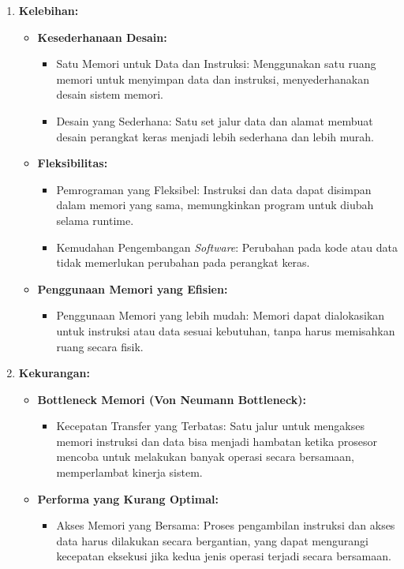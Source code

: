 \documentclass{article}
\begin{document}
\begin{enumerate}[label=\arabic*.]
  \item \textbf{Kelebihan:}
  \begin{itemize}
    \item \textbf{Kesederhanaan Desain:}
    \begin{itemize}
      \item Satu Memori untuk Data dan Instruksi: Menggunakan satu ruang memori untuk menyimpan data dan instruksi, menyederhanakan desain sistem memori.
      \item Desain yang Sederhana: Satu set jalur data dan alamat membuat desain perangkat keras menjadi lebih sederhana dan lebih murah.
    \end{itemize}
    
    \item \textbf{Fleksibilitas:}
    \begin{itemize}
      \item Pemrograman yang Fleksibel: Instruksi dan data dapat disimpan dalam memori yang sama, memungkinkan program untuk diubah selama runtime.
      \item Kemudahan Pengembangan \textit{Software}: Perubahan pada kode atau data tidak memerlukan perubahan pada perangkat keras.
    \end{itemize}
    
    \item \textbf{Penggunaan Memori yang Efisien:}
    \begin{itemize}
      \item Penggunaan Memori yang lebih mudah: Memori dapat dialokasikan untuk instruksi atau data sesuai kebutuhan, tanpa harus memisahkan ruang secara fisik.
    \end{itemize}
  \end{itemize}
  
  \item \textbf{Kekurangan:}
  \begin{itemize}
    \item \textbf{Bottleneck Memori (Von Neumann Bottleneck):}
    \begin{itemize}
      \item Kecepatan Transfer yang Terbatas: Satu jalur untuk mengakses memori instruksi dan data bisa menjadi hambatan ketika prosesor mencoba untuk melakukan banyak operasi secara bersamaan, memperlambat kinerja sistem.
    \end{itemize}
    
    \item \textbf{Performa yang Kurang Optimal:}
    \begin{itemize}
      \item Akses Memori yang Bersama: Proses pengambilan instruksi dan akses data harus dilakukan secara bergantian, yang dapat mengurangi kecepatan eksekusi jika kedua jenis operasi terjadi secara bersamaan.
    \end{itemize}
    

\end{itemize}
\end{enumerate}
\end{document}
